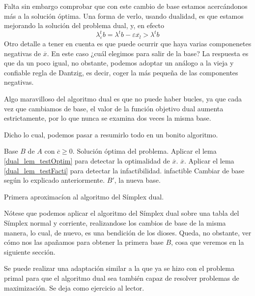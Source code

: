 Falta sin embargo comprobar que con este cambio de base estamos acercándonos más a la solución óptima. Una forma de verlo, usando dualidad, es que estamos mejorando la solución del problema dual, y, en efecto
\begin{equation*}
	\lambda_\varepsilon^tb=\lambda^tb-\varepsilon\overline{x_l}> \lambda^tb
\end{equation*}
Otro detalle a tener en cuenta es que puede ocurrir que haya varias componenetes negativas de $\overline{x}$. En este caso ¿cuál elegimos para salir de la base? La respuesta es que da un poco igual, no obstante, podemos adoptar un análogo a la vieja y confiable regla de Dantzig, es decir, coger la más pequeña de las componentes negativas.
\begin{obs}[Bucles]
	Algo maravilloso del algoritmo dual es que no puede haber bucles, ya que cada vez que cambiamos de base, el valor de la función objetivo dual aumenta estrictamente, por lo que nunca se examina dos veces la misma base.
\end{obs}
Dicho lo cual, podemos pasar a resumirlo todo en un bonito algoritmo.
\begin{algorithm}[H]
	\begin{algorithmic}[1]
		\REQUIRE Base $B$ de $A$ con $\overline{c}\geq 0$.
		\ENSURE Solución óptima del problema.
		\STATE Aplicar el lema \ref{dual_lem_testOptim} para detectar la optimalidad de $\overline{x}$.
		\RETURN $\overline{x}$.
		\ELSE 
		\STATE Aplicar el lema \ref{dual_lem_testFacti} para detectar la infactibilidad.
		\RETURN infactible
		\ELSE
		\STATE Cambiar de base según lo explicado anteriormente.
		\RETURN $B'$, la nueva base.
		\ENDIF
		\ENDIF	
	\end{algorithmic}
	\caption{Primera aproximacíon al algoritmo del Símplex dual.}\label{dual_alg_dual}
\end{algorithm}
Nótese que podemos aplicar el algoritmo del Símplex dual sobre una tabla del Símplex normal y corriente, realizandose los cambios de base de la misma manera, lo cual, de nuevo, es una bendición de los dioses. Queda, no obstante, ver cómo nos las apañamos para obtener la primera base $B$, cosa que veremos en la siguiente sección.
\begin{obs}[Maximización]
	Se puede realizar una adaptación similar a la que ya se hizo con el problema primal para que el algoritmo dual sea también capaz de resolver problemas de maximización. Se deja como ejercicio al lector.
\end{obs}
